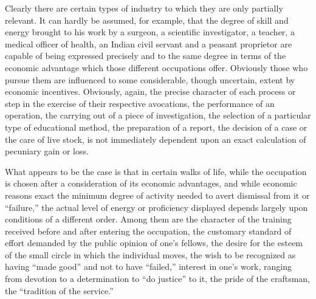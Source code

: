 \documentclass{book}
\begin{document}
Clearly there are certain types of industry to which they are only partially relevant. It can hardly be assumed, for example, that the degree of skill and energy brought to his work by a surgeon, a scientific investigator, a teacher, a medical officer of health, an Indian civil servant and a peasant proprietor are capable of being expressed precisely and to the same degree in terms of the economic advantage which those different occupations offer. Obviously those who pursue them are influenced to some considerable, though uncertain, extent by economic incentives. Obviously, again, the precise character of each process or step in the exercise of their respective avocations, the performance of an operation, the carrying out of a piece of investigation, the selection of a particular type of educational method, the preparation of a report, the decision of a case or the care of live stock, is not immediately dependent upon an exact calculation of pecuniary gain or loss.

What appears to be the case is that in certain walks of life, while the occupation is chosen after a consideration of its economic advantages, and while economic reasons exact the minimum degree of activity needed to avert dismissal from it or “failure,” the actual level of energy or proficiency displayed depends largely upon conditions of a different order. Among them are the character of the training received before and after entering the occupation, the customary standard of effort demanded by the public opinion of one’s fellows, the desire for the esteem of the small circle in which the individual moves, the wish to be recognized as having “made good” and not to have “failed,” interest in one’s work, ranging from devotion to a determination to “do justice” to it, the pride of the craftsman, the “tradition of the service.”
\end{document}
